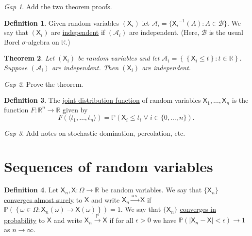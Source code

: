 \documentclass[11pt]{article}
\newcommand{\col}[1]{\mathscr{#1}}
\newcommand{\rv}[1]{\mathsf{#1}}
\newcommand{\p}{\mathbb{P}}
\newcommand{\bor}{\col{B}}
\newcommand{\defname}[1]{\underline{#1}}
\newcommand{\asto}{\xrightarrow{\text{a.s.}}}
\newcommand{\pto}{\xrightarrow{\p}}
\newcommand{\RR}{\mathbb{R}}
\theoremstyle{theorem}
\newtheorem{theorem}{Theorem}[section]
\theoremstyle{definition}
\newtheorem{definition}[theorem]{Definition}
\theoremstyle{remark}
\theoremstyle{step}
\theoremstyle{gap}
\newtheorem*{gap}{Gap}
\begin{document}
\begin{gap}
Add the two theorem proofs.
\end{gap}

\begin{definition}
Given random variables \((\rv{X}_i)\) let \(\col{A}_i = \{{\rv{X}_i}^{-1}(A) : A \in \bor\}\). We say that \((\rv{X}_i)\) are \defname{independent} if \((\col{A}_i)\) are independent. (Here, \(\bor\) is the usual Borel \(\sigma\)-algebra on \(\RR\).)
\end{definition}

\begin{theorem}
Let \((\rv{X}_i)\) be random variables and let \(\col{A}_i = \left\{\left\{\rv{X}_i \leq t\right\} : t \in \RR\right\}\). Suppose \((\col{A}_i)\) are independent. Then \((\rv{X}_i)\) are independent.
\end{theorem}

\begin{gap}
Prove the theorem.
\end{gap}

\begin{definition}
The \defname{joint distribution function} of random variables \(\rv{X}_1, \ldots, \rv{X}_n\) is the function \(F:\RR^n \to \RR\) given by \[F\left(\langle t_1, \ldots, t_n\rangle\right) = \p \left(\rv{X}_i \leq t_i \;\forall\; i \in \{0, \ldots, n\}\right).\]
\end{definition}

\begin{gap}
Add notes on stochastic domination, percolation, etc.
\end{gap}

\section{Sequences of random variables}

\begin{definition}
Let \(\rv{X}_n, \rv{X} : \Omega\to \RR\) be random variables. We say that \(\{\rv{X}_n\}\) \defname{converges almost surely} to \(\rv{X}\) and write \(\rv{X}_n \asto \rv{X}\) if \(\p\left(\left\{\omega \in \Omega : \rv{X}_n(\omega) \to \rv{X}(\omega)\right\}\right) = 1\). We say that \(\{\rv{X}_n\}\) \defname{converges in probability} to \(\rv{X}\) and write \(\rv{X}_n \pto \rv{X}\) if for all \(\epsilon>0\) we have \(\p\left(\left|\rv{X}_n-\rv{X}\right| < \epsilon\right) \to 1\) as \(n \to \infty\).
\end{definition}
\end{document}
